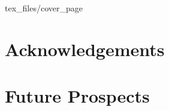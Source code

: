 \documentclass[12pt]{article}
\begin{document}
 {tex_files/cover_page}

\newpage
\section*{Acknowledgements}

\medskip


\newpage

\tableofcontents





\newpage



\newpage



\newpage



\section{Future Prospects}

\newpage

\printbibliography
\end{document}
